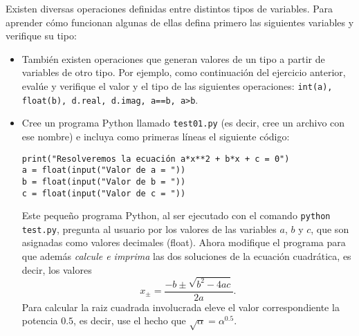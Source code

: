 \documentclass[11pt]{exam}
\begin{document}
\begin{questions}
\begin{parts}
\end{parts}
\item Existen diversas operaciones definidas entre distintos tipos de variables. Para aprender cómo funcionan algunas de ellas defina primero las siguientes variables y verifique su tipo:
\begin{itemize}

\begin{verbatim}
a = 3.14
b = 2
c = 5
d = 6+2j
e = "hola "
f = "mechon@s"
g = True
\end{verbatim}
A continuación imprima el valor y el tipo del resultado de cada una de las siguientes operaciones: \texttt{a+b, a+d, a+e, b+c, b+d, b+e, f+e, e+f, a*b, a*d, a*e, b*c, b*d, c*e, e*f, a**b, a**d, a**e, b**c, e**a, e**b, e**f, a/b, a/d, a/e, b/c, b/d, b/e, c/b, d/a, d/b, e/a, e/b, e/f,  a*g, b*g, not(g), g and False, g and True, g or False, g or True}. ¿Cuáles de estas operaciones no están definidas?
\item También existen operaciones que generan valores de un tipo a partir de variables de otro tipo. Por ejemplo, como continuación del ejercicio anterior, evalúe y verifique el valor y el tipo de las siguientes operaciones: \texttt{int(a), float(b), d.real, d.imag, a==b, a>b}.

\item Cree un programa Python llamado \texttt{test01.py} (es decir, cree un archivo con ese nombre) e incluya como primeras líneas el siguiente código:

\begin{verbatim}
print("Resolveremos la ecuación a*x**2 + b*x + c = 0")
a = float(input("Valor de a = "))
b = float(input("Valor de b = "))
c = float(input("Valor de c = "))
\end{verbatim}

Este pequeño programa Python, al ser ejecutado con el comando \texttt{python test.py}, pregunta al usuario por los valores de las variables $a$, $b$ y $c$, que son asignadas como valores decimales (float). Ahora modifique el programa para que además \textit{calcule e imprima} las dos soluciones de la ecuación cuadrática, es decir, los valores 
\begin{equation}
x_\pm=\frac{-b\pm\sqrt{b^2-4ac}}{2a}.
\end{equation}
Para calcular la raiz cuadrada involucrada eleve el valor correspondiente la potencia $0.5$, es decir, use el hecho que $\sqrt{\alpha}=\alpha^{0.5}$.
\end{itemize}


\end{questions}
\end{document}
